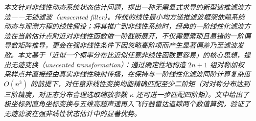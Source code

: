 \emph{本文针对非线性动态系统状态估计问题，提出一种无需显式求导的新型递推滤波方法——无迹滤波（unscented filter）。传统的线性最小均方递推滤波框架依赖系统动态与观测方程的线性假设；将其推广到非线性系统时，经典的一阶线性化滤波方法在当前估计点附近对非线性函数做一阶截断展开，不仅需要繁琐且易错的一阶偏导数矩阵推导，更会在强非线性条件下因忽略高阶项而产生显著偏差乃至滤波发散。本文基于「近似一个概率分布比近似任意非线性函数更容易」的核心思想，提出无迹变换（unscented transformation）：通过确定性地构造 $2n + 1$ 组对称加权采样点并直接经由真实非线性映射传播，在保持与一阶线性化滤波同阶计算复杂度 $O(n^3)$ 的前提下，对任意非线性变换均能精确匹配至少二阶矩（对对称分布达到三阶精度，对正态分布合理选取缩放参数 $\kappa$ 还可进一步匹配四阶矩）。文中给出了极坐标到直角坐标变换与五维高超声速再入飞行器雷达追踪两个数值算例，验证了无迹滤波在强非线性状态估计中的显著优势。}
